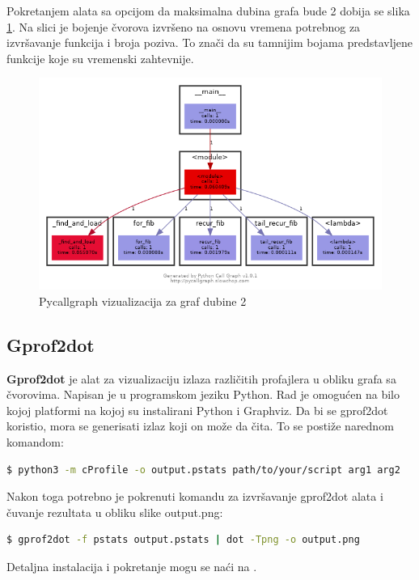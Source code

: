 \documentclass[a4paper]{article}
\begin{document}
Pokretanjem alata sa opcijom da maksimalna dubina grafa bude 2 dobija se slika \ref{fig:pycallgraph2_1}. Na slici je bojenje čvorova izvršeno na osnovu vremena potrebnog za izvršavanje funkcija i broja poziva. To znači da su tamnijim bojama predstavljene funkcije koje su vremenski zahtevnije.
\begin{figure}[h!]
\begin{center}
\includegraphics[scale=0.5]{pycallgraph.png}
 \end{center}
 \caption{Pycallgraph vizualizacija za graf dubine 2}
 \label{fig:pycallgraph2_1}
 \end{figure}
    
\subsection{Gprof2dot}
\label{profajler_5}
\textbf{Gprof2dot} je alat za vizualizaciju izlaza različitih profajlera u obliku grafa sa čvorovima. Napisan je u programskom jeziku Python. Rad je omogućen na bilo kojoj platformi na kojoj su instalirani Python i Graphviz. 
Da bi se gprof2dot koristio, mora se generisati izlaz koji on može da čita. To se postiže narednom komandom:
\begin{lstlisting}[language=bash, belowskip=-\baselineskip]
  $ python3 -m cProfile -o output.pstats path/to/your/script arg1 arg2
\end{lstlisting}
Nakon toga potrebno je pokrenuti komandu za izvršavanje gprof2dot alata i čuvanje rezultata u obliku slike output.png:
\begin{lstlisting}[language=bash, frame=single, label=lst:gprof2dot, belowskip=-\baselineskip]
  $ gprof2dot -f pstats output.pstats | dot -Tpng -o output.png
\end{lstlisting}
Detaljna instalacija i pokretanje mogu se naći na \cite{gprof}.
\end{document}

